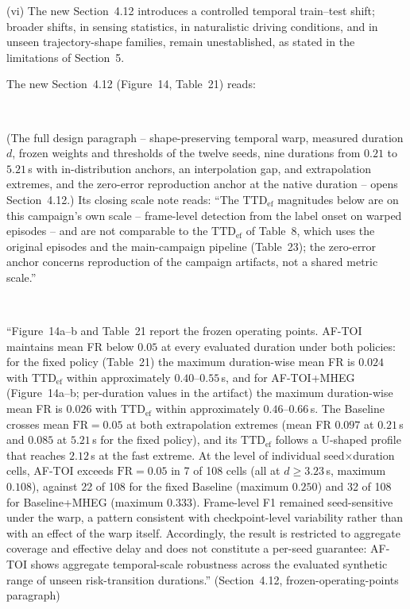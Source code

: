 \documentclass[1p,12pt,authoryear]{elsarticle}
\begin{document}
(vi) The new Section~4.12 introduces a controlled temporal train--test shift; broader shifts, in sensing statistics, in naturalistic driving conditions, and in unseen trajectory-shape families, remain unestablished, as stated in the limitations of Section~5.

\vspace{2mm}
\noindent The new Section~4.12 (Figure~14, Table~21) reads:

~

(The full design paragraph -- shape-preserving temporal warp, measured duration $d$, frozen weights and thresholds of the twelve seeds, nine durations from $0.21$ to $5.21$\,s with in-distribution anchors, an interpolation gap, and extrapolation extremes, and the zero-error reproduction anchor at the native duration -- opens Section~4.12.) Its closing scale note reads: ``The $\mathrm{TTD}_{\mathrm{ef}}$ magnitudes below are on this campaign's own scale -- frame-level detection from the label onset on warped episodes -- and are not comparable to the $\mathrm{TTD}_{\mathrm{ef}}$ of Table~8, which uses the original episodes and the main-campaign pipeline (Table~23); the zero-error anchor concerns reproduction of the campaign artifacts, not a shared metric scale.''

~

``Figure~14a--b and Table~21 report the frozen operating points. AF-TOI maintains mean FR below $0.05$ at every evaluated duration under both policies: for the fixed policy (Table~21) the maximum duration-wise mean FR is $0.024$ with $\mathrm{TTD}_{\mathrm{ef}}$ within approximately $0.40$--$0.55$\,s, and for AF-TOI+MHEG (Figure~14a--b; per-duration values in the artifact) the maximum duration-wise mean FR is $0.026$ with $\mathrm{TTD}_{\mathrm{ef}}$ within approximately $0.46$--$0.66$\,s. The Baseline crosses mean $\mathrm{FR}=0.05$ at both extrapolation extremes (mean FR $0.097$ at $0.21$\,s and $0.085$ at $5.21$\,s for the fixed policy), and its $\mathrm{TTD}_{\mathrm{ef}}$ follows a U-shaped profile that reaches $2.12$\,s at the fast extreme. At the level of individual seed$\times$duration cells, AF-TOI exceeds $\mathrm{FR}=0.05$ in 7 of 108 cells (all at $d\ge3.23$\,s, maximum $0.108$), against 22 of 108 for the fixed Baseline (maximum $0.250$) and 32 of 108 for Baseline+MHEG (maximum $0.333$). Frame-level F1 remained seed-sensitive under the warp, a pattern consistent with checkpoint-level variability rather than with an effect of the warp itself. Accordingly, the result is restricted to aggregate coverage and effective delay and does not constitute a per-seed guarantee: AF-TOI shows aggregate temporal-scale robustness across the evaluated synthetic range of unseen risk-transition durations.'' (Section~4.12, frozen-operating-points paragraph)
\end{document}
